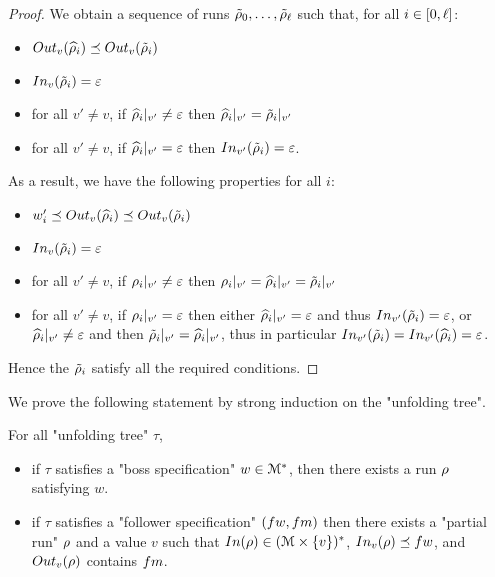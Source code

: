 \begin{proof}
We obtain a sequence of runs $\Tilde{\run}_0, \ldots, \Tilde{\run}_\ell$ such that, for all $i\in\nset{0}{\ell}$:
\begin{itemize}
	\item $\voutput{v}{\widehat{\run}_i} \subword \voutput{v}{\Tilde{\run}_i}$
	
	\item $\vinput{v}{\Tilde{\run}_i} = \epsilon$
	
	\item for all $v' \neq v$, if $\vproj{v'}{\widehat{\run}_i} \neq \epsilon$ then $\vproj{v'}{\widehat{\run}_i} = \vproj{v'}{\Tilde{\run}_i}$
	
	\item for all $v' \neq v$, if $\vproj{v'}{\widehat{\run}_i} = \epsilon$ then  $\vinput{v'}{\Tilde{\run}_i} = \epsilon$.
\end{itemize}

As a result, we have the following properties for all $i$:
\begin{itemize}
	\item $w'_i \subword \voutput{v}{\widehat{\run}_i} \subword \voutput{v}{\Tilde{\run}_i}$
	
	\item $\vinput{v}{\Tilde{\run}_i} = \epsilon$
	
	\item for all $v' \neq v$, if $\vproj{v'}{\run_i} \neq \epsilon$ then $\vproj{v'}{\run_i} = \vproj{v'}{\widehat{\run}_i} = \vproj{v'}{\Tilde{\run}_i}$
	
	\item for all $v' \neq v$, if $\vproj{v'}{\run_i} = \epsilon$ then either $\vproj{v'}{\widehat{\run}_i} = \epsilon$ and thus $\vinput{v'}{\Tilde{\run}_i} = \epsilon$, or $\vproj{v'}{\widehat{\run}_i} \neq \epsilon$ and then $\vproj{v'}{\Tilde{\run}_i} = \vproj{v'}{\widehat{\run}_i}$, thus in particular $\vinput{v'}{\Tilde{\run}_i} = \vinput{v'}{\widehat{\run}_i} = \epsilon$. 
\end{itemize}

Hence the $\Tilde{\run}_i$ satisfy all the required conditions.
\end{proof}

\LemTreeToRun*


	We prove the following statement by strong induction on the "unfolding tree". 
	
	For all "unfolding tree" $\tau$, 
	
	\begin{itemize}
		\item if $\tau$ satisfies a "boss specification" $w \in \messages^*$, then there exists a run $\run$ satisfying $w$.
		
		\item if $\tau$ satisfies a "follower specification" $(\followwordspec, \followmessagespec)$ then there exists a "partial run" $\run$ and a value $v$ such that $\Input{\run} \in (\messages\times \set{v})^*$, $\vinput{v}{\run} \subword \followwordspec$, and $\voutput{v}{\run}$ contains $\followmessagespec$.
	\end{itemize}
	
